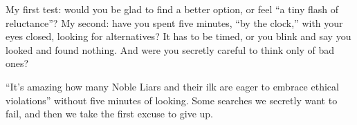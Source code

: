 My first test: would you be glad to find a better option, or feel ``a tiny flash of reluctance''?  My second: have you spent five minutes, ``by the clock,'' with your eyes closed, looking for alternatives? It has to be timed, or you blink and say you looked and found nothing. And were you secretly careful to think only of bad ones?

``It's amazing how many Noble Liars and their ilk are eager to embrace ethical violations'' without five minutes of looking. Some searches we secretly want to fail, and then we take the first excuse to give up.
